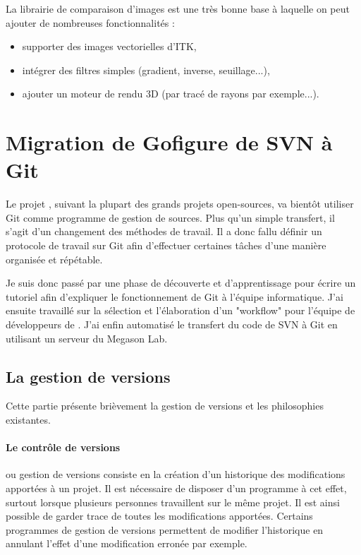 La librairie de comparaison d'images est une très bonne base à laquelle on peut ajouter de nombreuses fonctionnalités :\begin{itemize}
  \item supporter des images vectorielles d'ITK,
  \item intégrer des filtres simples (gradient, inverse, seuillage...),
  \item ajouter un moteur de rendu 3D (par tracé de rayons par exemple...).
\end{itemize}




\clearpage



\section{Migration de Gofigure de SVN à Git}

Le projet {\gofigure}, suivant la plupart des grands projets open-sources, va bientôt utiliser Git comme programme de gestion de sources.
Plus qu'un simple transfert, il s'agit d'un changement des méthodes de travail.
Il a donc fallu définir un protocole de travail sur Git 
afin d'effectuer certaines tâches d'une manière organisée et répétable. 

Je suis donc passé par une phase de découverte et d'apprentissage pour écrire un tutoriel 
afin d'expliquer le fonctionnement de Git à l'équipe informatique. J'ai ensuite travaillé sur la sélection et l'élaboration d'un "workflow"
pour l'équipe de développeurs de {\gofigure}.
J'ai enfin automatisé le transfert du code de SVN à Git en utilisant un serveur du Megason Lab.



\subsection{La gestion de versions}

Cette partie présente brièvement la gestion de versions et les philosophies existantes.

\paragraph{Le contrôle de versions} ou gestion de versions consiste en
la création d'un historique des modifications apportées à un projet.
Il est nécessaire de disposer d'un programme à cet effet,
surtout lorsque plusieurs personnes travaillent sur le même projet.
Il est ainsi possible de garder trace de toutes les modifications apportées.
Certains programmes de gestion de versions permettent
de modifier l'historique en annulant l'effet d'une modification erronée par exemple.

